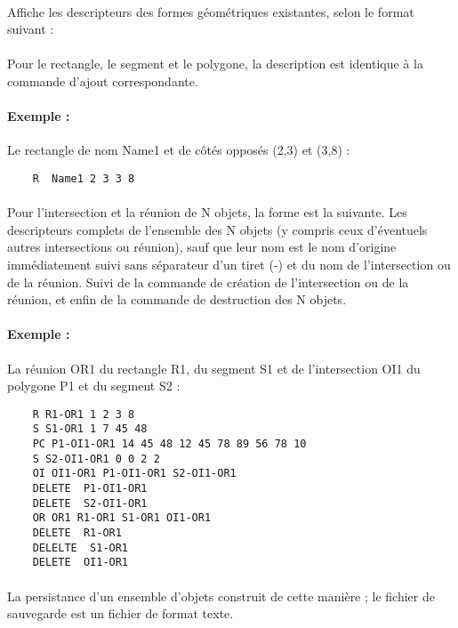 \documentclass[a4paper, 12pts]{article}
\begin{document}
\paragraph{}
Affiche les descripteurs des formes géométriques existantes, selon le format suivant :
\paragraph{}
Pour le rectangle, le segment et le polygone, la description est identique à la commande d'ajout correspondante.
\paragraph{Exemple :}Le rectangle de nom Name1 et de côtés opposés (2,3) et (3,8) :
\begin{lstlisting}
	R  Name1 2 3 3 8
\end{lstlisting}
\paragraph{}
Pour l'intersection et la réunion de N objets, la forme est la suivante. Les descripteurs complets de l'ensemble des N objets (y compris ceux d'éventuels autres intersections ou réunion), sauf que leur nom est le nom d'origine immédiatement suivi sans séparateur d'un tiret (-) et du nom de l'intersection ou de la réunion. Suivi de la commande de création de l'intersection ou de la réunion, et enfin de la commande de destruction des N objets.
\paragraph{Exemple :}
La réunion OR1 du rectangle R1, du segment S1 et de l'intersection OI1 du polygone P1 et du segment S2 :
\begin{lstlisting}
	R R1-OR1 1 2 3 8
	S S1-OR1 1 7 45 48
	PC P1-OI1-OR1 14 45 48 12 45 78 89 56 78 10
	S S2-OI1-OR1 0 0 2 2
	OI OI1-OR1 P1-OI1-OR1 S2-OI1-OR1  
	DELETE  P1-OI1-OR1
	DELETE  S2-OI1-OR1
	OR OR1 R1-OR1 S1-OR1 OI1-OR1
	DELETE  R1-OR1
	DELELTE  S1-OR1
	DELETE  OI1-OR1
\end{lstlisting}
\paragraph{}
La persistance d'un ensemble d'objets construit de cette manière ; le fichier
de sauvegarde est un fichier de format texte.
\end{document}
